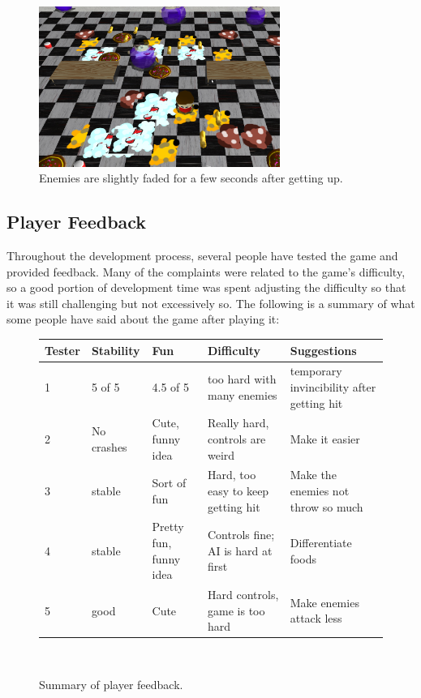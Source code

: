 \documentclass{article}
\begin{document}
\begin{figure}[H]
  \centering
    \includegraphics[width=0.7\textwidth]{enemiesinactive}
    \caption{Enemies are slightly faded for a few seconds after getting up.}    
\end{figure}

\subsection{Player Feedback}
Throughout the development process, several people have tested the game and provided feedback. Many of the complaints were related to the game's difficulty, so a good portion of development time was spent adjusting the difficulty so that it was still challenging but not excessively so. The following is a summary of what some people have said about the game after playing it: \\

\begin{figure}[H]
    \begin{tabular}{|p{1cm}|p{2cm}|p{3cm}|p{3cm}|p{5cm}|}
    \hline
    Tester & Stability & Fun & Difficulty & Suggestions \\ \hline
    1 & 5 of 5 & 4.5 of 5 & too hard with many enemies & temporary invincibility after getting hit \\ \hline
    2 & No crashes & Cute, funny idea & Really hard, controls are weird & Make it easier \\ \hline
    3 & stable & Sort of fun & Hard, too easy to keep getting hit & Make the enemies not throw so much \\ \hline
    4 & stable & Pretty fun, funny idea & Controls fine; AI is hard at first & Differentiate foods \\ \hline
    5 & good & Cute & Hard controls, game is too hard & Make enemies attack less \\
    \hline
    \end{tabular} \\
    \caption{Summary of player feedback.}
\end{figure}    
\end{document}
